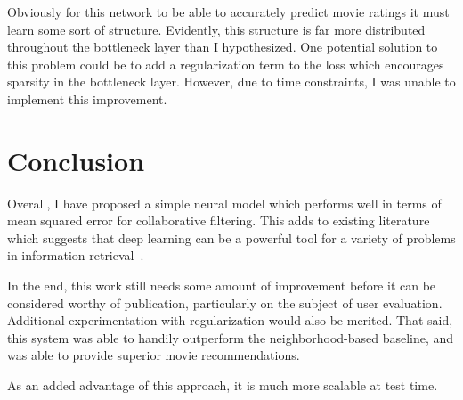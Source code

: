 \documentclass[12pt]{article}
\begin{document}
Obviously for this network to be able to accurately predict movie ratings it
must learn some sort of structure.
Evidently, this structure is far more distributed throughout the bottleneck
layer than I hypothesized.
One potential solution to this problem could be to add a regularization term
to the loss which encourages sparsity in the bottleneck layer.
However, due to time constraints, I was unable to implement this improvement.

\section{Conclusion}

Overall, I have proposed a simple neural model which performs well in terms of
mean squared error for collaborative filtering.
This adds to existing literature which suggests that deep learning can be a
powerful tool for a variety of problems in information
retrieval~\cite{dl-recsys-survey}.

In the end, this work still needs some amount of improvement before it can be
considered worthy of publication, particularly on the subject of user
evaluation.
Additional experimentation with regularization would also be merited.
That said, this system was able to handily outperform the neighborhood-based
baseline, and was able to provide superior movie recommendations.

As an added advantage of this approach, it is much more scalable at test time.



\end{document}
